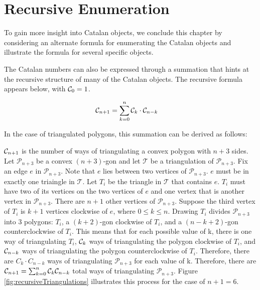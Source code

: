 \section{Recursive Enumeration}

To gain more insight into Catalan objects, we conclude this chapter by considering an alternate formula for enumerating the Catalan objects and illustrate the formula for several specific objects.

The Catalan numbers can also be expressed through a summation that hints at the recursive structure of many of the Catalan objects.  
The recursive formula appears below, with $\mathcal{C}_0=1$.

\begin{align}
    \mathcal{C}_{n+1} &= \sum_{k=0}^{n}{\mathcal{C}_{k}\cdot\mathcal{C}_{n-k}}
\end{align} 

In the case of triangulated polygons, this summation can be derived as follows:

$\mathcal{C}_{n+1}$ is the number of ways of triangulating a convex polygon with $n+3$ sides.  Let $\mathcal{P}_{n+3}$ be a convex $(n+3)$-gon and let $\mathcal{T}$ be a triangulation of $\mathcal{P}_{n+3}$. Fix an edge $e$ in $\mathcal{P}_{n+3}$.  Note that $e$ lies between two vertices of $\mathcal{P}_{n+3}$. $e$ must be in exactly one triaingle in $\mathcal{T}$.  Let $T_{i}$ be the triangle in $\mathcal{T}$ that contains $e$.  $T_{i}$ must have two of its vertices on the two vertices of $e$ and one vertex that is another vertex in $\mathcal{P}_{n+3}$.  There are $n+1$ other vertices of $\mathcal{P}_{n+3}$.  Suppose the third vertex of $T_i$ is $k+1$ vertices clockwise of $e$, where $0\le k \le n$. Drawing $T_i$ divides $\mathcal{P}_{n+3}$ into 3 polygons: $T_i$, a $(k+2)$-gon clockwise of $T_i$, and a $(n-k+2)$-gon counterclockwise of $T_i$. This means that for each possible value of k, there is one way of triangulating $T_i$, $\mathcal{C}_k$ ways of triangulating the polygon clockwise of $T_i$, and $\mathcal{C}_{n-k}$ ways of triangulating the polygon counterclockwise of $T_i$.  Therefore, there are $C_k\cdot C_{n-k}$ ways of triangulating $\mathcal{P}_{n+3}$ for each value of k.  Therefore, there are $\mathcal{C}_{n+1}=\sum_{k=0}^{n}{\mathcal{C}_{k}\mathcal{C}_{n-k}}$ total ways of triangulating $\mathcal{P}_{n+3}$. Figure \ref{fig:recursiveTriangulations} illustrates this process for the case of $n+1=6$.

